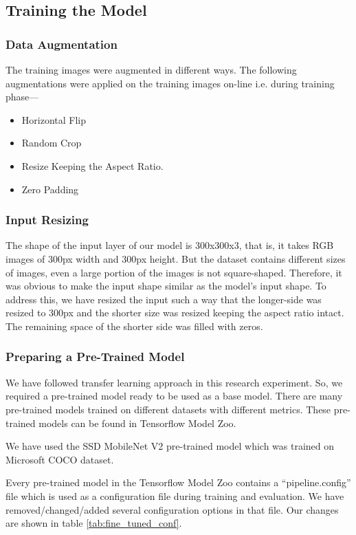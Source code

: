 \documentclass[conference]{IEEEtran}
\begin{document}
\subsection{Training the Model}
\subsubsection{Data Augmentation}
The training images were augmented in different ways. The following augmentations were applied on the training images on-line i.e. during training phase---
\begin{itemize}
  \item Horizontal Flip
  \item Random Crop
  \item Resize Keeping the Aspect Ratio.
  \item Zero Padding
\end{itemize}
      
\subsubsection{Input Resizing}
The shape of the input layer of our model is 300x300x3, that is, it takes RGB images of 300px width and 300px height. But the dataset contains different sizes of images, even a large portion of the images is not square-shaped. Therefore, it was obvious to make the input shape similar as the model's input shape. To address this, we have resized the input such a way that the longer-side was resized to 300px and the shorter size was resized keeping the aspect ratio intact. The remaining space of the shorter side was filled with zeros.
      
\subsubsection{Preparing a Pre-Trained Model}
We have followed transfer learning approach\cite{pan2009survey} in this research experiment. So, we required a pre-trained model ready to be used as a base model. There are many pre-trained models trained on different datasets with different metrics. These pre-trained models can be found in Tensorflow\cite{dillon2017tensorflow} Model Zoo\cite{tf_model_zoo}.
        
We have used the SSD\cite{liu2016ssd} MobileNet\cite{howard2017mobilenets} V2 pre-trained model which was trained on Microsoft COCO dataset\cite{lin2014microsoft}.
        
Every pre-trained model in the Tensorflow Model Zoo\cite{tf_model_zoo} contains a ``pipeline.config'' file which is used as a configuration file during training and evaluation. We have removed/changed/added several configuration options in that file. Our changes are shown in table \ref{tab:fine_tuned_conf}.
        
\end{document}
